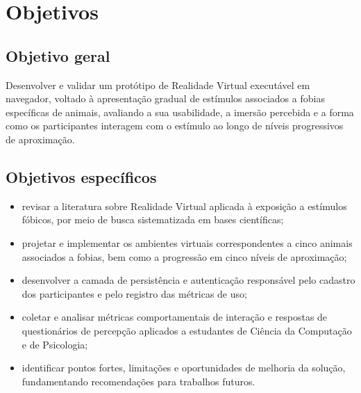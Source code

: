 \section{Objetivos}

\subsection{Objetivo geral}

Desenvolver e validar um protótipo de Realidade Virtual executável em
navegador, voltado à apresentação gradual de estímulos associados a fobias
específicas de animais, avaliando a sua usabilidade, a imersão percebida e a
forma como os participantes interagem com o estímulo ao longo de níveis
progressivos de aproximação.

\subsection{Objetivos específicos}

\begin{itemize}
  \item revisar a literatura sobre Realidade Virtual aplicada à exposição a
  estímulos fóbicos, por meio de busca sistematizada em bases científicas;

  \item projetar e implementar os ambientes virtuais correspondentes a cinco
  animais associados a fobias, bem como a progressão em cinco níveis de
  aproximação;

  \item desenvolver a camada de persistência e autenticação responsável pelo
  cadastro dos participantes e pelo registro das métricas de uso;

  \item coletar e analisar métricas comportamentais de interação e respostas
  de questionários de percepção aplicados a estudantes de Ciência da
  Computação e de Psicologia;

  \item identificar pontos fortes, limitações e oportunidades de melhoria da
  solução, fundamentando recomendações para trabalhos futuros.
\end{itemize}
